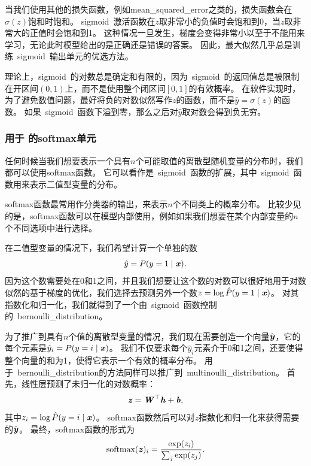 当我们使用其他的损失函数，例如\gls{mean_squared_error}之类的，损失函数会在$\sigma(z)$饱和时饱和。
\gls{sigmoid}~激活函数在$z$取非常小的负值时会饱和到0，当$z$取非常大的正值时会饱和到1。
这种情况一旦发生，梯度会变得非常小以至于不能用来学习，无论此时模型给出的是正确还是错误的答案。
因此，最大似然几乎总是训练~\gls{sigmoid}~输出单元的优选方法。

理论上，\gls{sigmoid}~的对数总是确定和有限的，因为~\gls{sigmoid}~的返回值总是被限制在开区间$(0, 1)$上，而不是使用整个闭区间$[0, 1]$的有效概率。
在软件实现时，为了避免数值问题，最好将负的对数似然写作$z$的函数，而不是$\hat{y}=\sigma(z)$的函数。
如果~\gls{sigmoid}~函数下溢到零，那么之后对$\hat{y}$取对数会得到负无穷。

\subsubsection{用于
的softmax单元}
\label{sec:softmax_units_for_multinoulli_output_distributions}

任何时候当我们想要表示一个具有$n$个可能取值的离散型随机变量的分布时，我们都可以使用softmax函数。
它可以看作是~\gls{sigmoid}~函数的扩展，其中~\gls{sigmoid}~函数用来表示二值型变量的分布。


softmax函数最常用作分类器的输出，来表示$n$个不同类上的概率分布。
比较少见的是，softmax函数可以在模型内部使用，例如如果我们想要在某个内部变量的$n$个不同选项中进行选择。

在二值型变量的情况下，我们希望计算一个单独的数
\begin{equation}
\hat{y} = P(y=1\mid\boldsymbol{\mathit{x}}).
\end{equation}
因为这个数需要处在0和1之间，并且我们想要让这个数的对数可以很好地用于对数似然的基于梯度的优化，我们选择去预测另外一个数$z=\log \hat{P}(y=1\mid\boldsymbol{\mathit{x}})$。
对其指数化和归一化，我们就得到了一个由~\gls{sigmoid}~函数控制的~\gls{bernoulli_distribution}。

为了推广到具有$n$个值的离散型变量的情况，我们现在需要创造一个向量$\hat{\boldsymbol{\mathit{y}}}$，它的每个元素是$\hat{y}_i = P(y=i\mid\boldsymbol{\mathit{x}})$。
我们不仅要求每个$\hat{y}_i$元素介于0和1之间，还要使得整个向量的和为1，使得它表示一个有效的概率分布。
用于~\gls{bernoulli_distribution}的方法同样可以推广到~\gls{multinoulli_distribution}。
首先，线性层预测了未归一化的对数概率：
\begin{equation}
\boldsymbol{\mathit{z}} = \boldsymbol{\mathit{W}}^\top \boldsymbol{\mathit{h}}+\boldsymbol{\mathit{b}},
\end{equation}
其中$z_i=\log \hat{P}(y=i\mid\boldsymbol{\mathit{x}})$。
softmax函数然后可以对$z$指数化和归一化来获得需要的$\hat{\boldsymbol{\mathit{y}}}$。
最终，softmax函数的形式为
\begin{equation}
\text{softmax}(\boldsymbol{\mathit{z}})_i = \frac{\exp(z_i)}{\sum_j \exp(z_j)}.
\end{equation}

